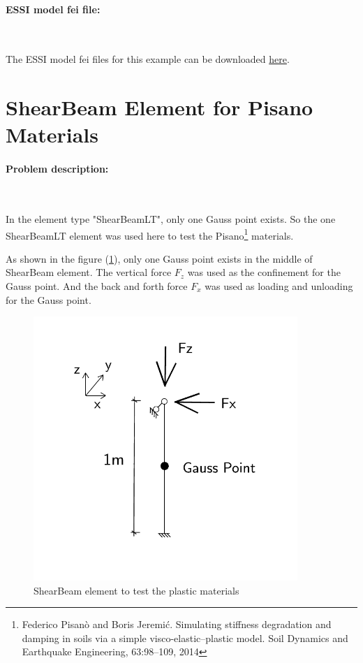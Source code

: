 \documentclass[fleqn,11pt]{article}
\begin{document}
\paragraph{ESSI model fei file: } ~



The ESSI model fei files for this example can be downloaded \href{https://github.com/BorisJeremic/Real-ESSI-Examples/blob/master/model_fei_file/beam_elastic_presentation_example/beam_elastic_presentation_example.tgz?raw=true}{here}.














\newpage
\section{ShearBeam Element for Pisano Materials}

\paragraph{Problem description:} ~

In the element type "ShearBeamLT", only one Gauss point exists. So the one ShearBeamLT element was used here to test the Pisano\footnote{Federico Pisanò and Boris Jeremić. Simulating stiffness degradation and damping in soils via a simple
visco-elastic–plastic model. Soil Dynamics and Earthquake Engineering, 63:98–109, 2014} materials. 

As shown in the figure (\ref{fig ShearBeam element to test the plastic materials}), only one Gauss point exists in the middle of ShearBeam element. The vertical force $F_z$ was used as the confinement for the Gauss point. And the back and forth force $F_x$ was used as loading and unloading for the Gauss point. 

\begin{figure}[H]
  \centering
  \includegraphics[width=10cm]{../Figure-files/pisano_descrip.pdf}
  \caption{ShearBeam element to test the plastic materials}
  \label{fig ShearBeam element to test the plastic materials}
\end{figure}
\end{document}
